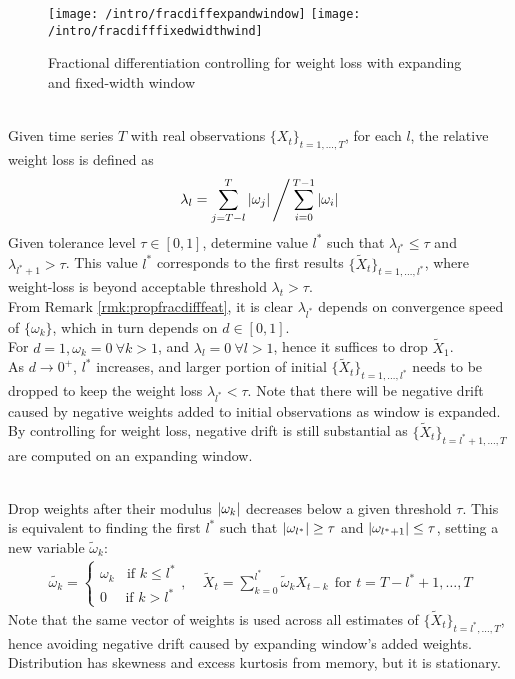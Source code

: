 \begin{figure}[H]
\centering
\texttt{[image: /intro/fracdiffexpandwindow]}
\texttt{[image: /intro/fracdifffixedwidthwind]}
\caption{Fractional differentiation controlling for weight loss with expanding and fixed-width window}
\end{figure}

\begin{method} \\
Given time series $T$ with real observations $\{X_t\}_{t = 1, \ldots, T}$, for each $l$, the relative weight loss is defined as
\begin{equation}
\lambda_l = \sum\limits_{j=T-l}^T \left\lvert\omega_j\right\rvert \Bigg/ \sum\limits_{i=0}^{T-1} \left\lvert\omega_i\right\rvert \nonumber
\end{equation}
Given tolerance level $\tau \in [0,1]$, determine value $l^*$ such that $\lambda_{l^*} \leq \tau$ and $\lambda_{l^* + 1} > \tau$. This value $l^*$ corresponds to the first results $\{\tilde{X}_t \}_{t = 1, \ldots, l^*}$, where weight-loss is beyond acceptable threshold $\lambda_t > \tau$.\\
From Remark \ref{rmk:propfracdifffeat}, it is clear $\lambda_{l^*}$ depends on convergence speed of $\{\omega_k \}$, which in turn depends on $d \in [0,1]$.\\
For $d = 1, \omega_k = 0 \ \forall k > 1$, and $\lambda_l = 0 \ \forall l > 1$, hence it suffices to drop $\tilde{X}_1$.\\
As $d \rightarrow 0^+$, $l^*$ increases, and larger portion of initial $\{\tilde{X}_t \}_{t = 1, \ldots, l^*}$ needs to be dropped to keep the weight loss $\lambda_{l^*} < \tau$. Note that there will be negative drift caused by negative weights added to initial observations as window is expanded. By controlling for weight loss, negative drift is still substantial as $\{\tilde{X}_t \}_{t = l^* + 1, \ldots, T}$ are computed on an expanding window.
\end{method}

\begin{method} \\
Drop weights after their modulus $\left\lvert\omega_k\right\rvert$ decreases below a given threshold $\tau$. This is equivalent to finding the first $l^*$ such that $\left\lvert\omega_{l^*}\right\rvert \geq \tau$ and $\left\lvert\omega_{l^* + 1}\right\rvert \leq \tau$, setting a new variable $\tilde{\omega}_k$:
\begin{align}
\tilde{\omega_k} = 
\begin{cases}
\omega_k \ \ \ \ \text{if } k \leq l^* \\
0 \ \ \ \ \ \ \text{if } k > l^*
\end{cases}, \ \ \ \ \
\tilde{X}_t = \sum\limits_{k=0}^{l^*} \tilde{\omega}_k X_{t-k} \ \ \text{for } t = T- l^* + 1, \ldots, T \nonumber
\end{align}
Note that the same vector of weights is used across all estimates of $\{\tilde{X}_t \}_{t = l^*, \ldots, T}$, hence avoiding negative drift caused by expanding window's added weights.\\
Distribution has skewness and excess kurtosis from memory, but it is stationary.
\end{method}